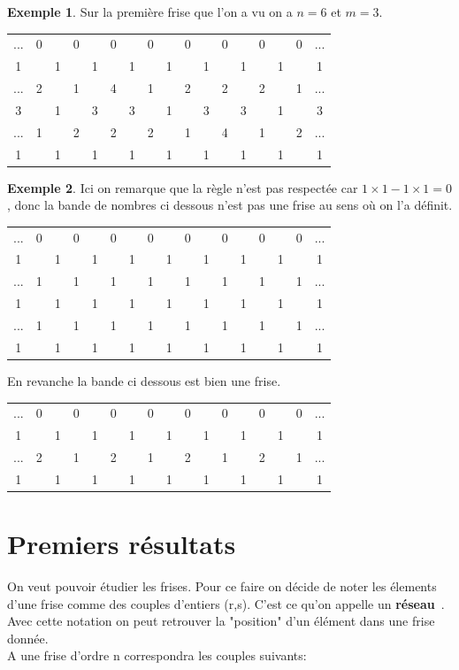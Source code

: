 \documentclass[a4paper]{article}
\theoremstyle{plain}
\theoremstyle{definition}
\newtheorem{exmp}{Exemple}[section]
\theoremstyle{proof}
\theoremstyle{remark}
\begin{document}
\begin{exmp}
Sur la première frise que l'on a vu on a $n=6$ et $m=3$.
\begin{center}
\begin{tabular}{ccccccccccccccccc}
...&0&&0&&0&&0&&0&&0&&0&&0&...\\
1&&1&&1&&1&&1&&1&&1&&1&&1\\
...&2&&1&&4&&1&&2&&2&&2&&1&...\\
3&&1&&3&&3&&1&&3&&3&&1&&3\\
...&1&&2&&2&&2&&1&&4&&1&&2&...\\
1&&1&&1&&1&&1&&1&&1&&1&&1\\
\end{tabular}
\end{center}
\end{exmp}

\begin{exmp}
Ici on remarque que la règle n'est pas respectée car $1\times1-1\times1=0$, donc la bande de nombres ci dessous n'est pas une frise au sens où on l'a définit.
\begin{center}
\begin{tabular}{ccccccccccccccccc}
...&0&&0&&0&&0&&0&&0&&0&&0&...\\
1&&1&&1&&1&&1&&1&&1&&1&&1\\
...&1&&1&&1&&1&&1&&1&&1&&1&...\\
1&&1&&1&&1&&1&&1&&1&&1&&1\\
...&1&&1&&1&&1&&1&&1&&1&&1&...\\
1&&1&&1&&1&&1&&1&&1&&1&&1\\
\end{tabular}
\end{center}
En revanche la bande ci dessous est bien une frise.
\begin{center}
\begin{tabular}{ccccccccccccccccc}
...&0&&0&&0&&0&&0&&0&&0&&0&...\\
1&&1&&1&&1&&1&&1&&1&&1&&1\\
...&2&&1&&2&&1&&2&&1&&2&&1&...\\
1&&1&&1&&1&&1&&1&&1&&1&&1\\
\end{tabular}
\end{center}
\end{exmp}

\section{Premiers résultats}
On veut pouvoir étudier les frises. Pour ce faire on décide de noter les élements d'une frise comme des couples d'entiers (r,s). C'est ce qu'on appelle un \textbf{réseau}\ . Avec cette notation on peut retrouver la "position" d'un élément dans une frise donnée.
\\
A une frise d'ordre n correspondra les couples suivants:
\end{document}
